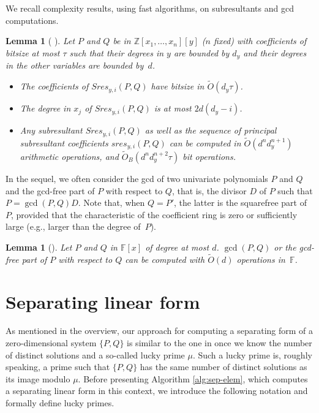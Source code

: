 \documentclass{sig-alternate}
\makeatletter
\newtheorem{lemma}[theorem]{Lemma}
\newcommand{\sO}{\ensuremath{\widetilde{{O}}}}
\newcommand{\sOB}{\ensuremath{\widetilde{{O}}_B}}
\newcommand{\blue}[1]{\color{blue}#1\color{black}\xspace}
\renewcommand{\blue}[1]{#1\xspace}
\def\cramped                           {\parskip0pt\@topsep0pt       \itemsep0pt\parsep0pt
}
\makeatother
\begin{document}
\quad
We recall complexity results, using fast algorithms, on subresultants and
gcd computations. 

\begin{lemma}[{\cite[Prop. 8.46]{BPR06} \cite[\S 8]{Reischert1997} \cite[Cor. 11.15]{vzGGer2}}]
  \label{complexity:subresultant}
  Let $P$ and $Q$ be in $\mathbb{Z}[x_1,\ldots, x_n][y] $ ($n$ fixed) with
  coefficients of bitsize at most  $\tau$
such that their degrees in $y$ are bounded by
  $d_{y}$ and their degrees in the other variables are bounded by~$d$. 
  \begin{itemize}\cramped
  \item The coefficients of $Sres_{y,i}(P,Q)$ have bitsize in
    $\sO(d_{y}\tau)$. 
  \item The degree in $x_j$ of $Sres_{y,i}(P,Q)$ is at most
    $2d(d_{y}-i)$. 
  \item Any subresultant $Sres_{y,i}(P,Q)$ as well as the sequence of principal subresultant coefficients $sres_{y,i}(P,Q)$ can be computed in
$\sO(d^{n} d_{y}^{n+1})$ arithmetic operations, 
    and $\sOB(d^{n}
    d_{y}^{n+2}\tau)$ bit operations. 
\end{itemize}
\end{lemma}    

In the sequel, we often consider the gcd of two univariate polynomials $P$ and
$Q$ and the gcd-free part of $P$ with respect to $Q$, that is, the divisor $D$
of $P$ such that $P=\gcd(P,Q)D$. Note that, when $Q=P'$,  the latter is the
squarefree part of~$P$, \blue{provided that the characteristic of the
  coefficient ring is zero or sufficiently large (e.g., larger than the degree of~$P$)}. 

\begin{lemma}[{\cite[Rem. 10.19]{BPR06}}]
\label{complexity:gcd}
  Let $P$ and $Q$ in $\mathbb{F}[x]$ of degree at most $d$. $\gcd(P,Q)$
or the gcd-free part of $P$ with respect to $Q$ can be computed with
  $\sO(d)$ operations in~$\mathbb{F}$.
\end{lemma}




\section{Separating linear form}
\label{sec:sep-form}


As mentioned in the overview, our approach for computing a separating form of a zero-dimensional
system $\{P,Q\}$   is similar to the one
in \blue{\cite{bouzidiJSC2014a}} \blue{once we know} the number of distinct solutions and a
so-called lucky prime $\mu$. \blue{Such a  lucky prime} is, roughly speaking, a prime such
that $\{P,Q\}$ \blue{has} the same number of distinct solutions as its 
\blue{image modulo $\mu$.}
Before presenting Algorithm \ref{alg:sep-elem}, \blue{which computes a separating linear form in
this context,} we introduce  the following notation and  formally define lucky primes.
\end{document}
